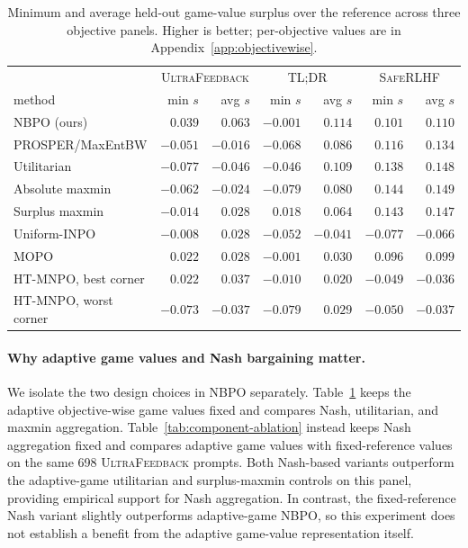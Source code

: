 \documentclass{article}
\theoremstyle{remark}
\theoremstyle{plain}
\newcommand{\NBPO}{\textsc{NBPO}}
\begin{document}
\begin{table}[t]
\centering\scriptsize
\setlength{\tabcolsep}{2.6pt}
\caption{Minimum and average held-out game-value surplus over the reference across three objective panels. Higher is better; per-objective values are in Appendix~\ref{app:objectivewise}.}
\label{tab:multi-dataset-surplus}
\begin{tabular}{lrrrrrr}
\toprule
& \multicolumn{2}{c}{\textsc{UltraFeedback}} & \multicolumn{2}{c}{\textsc{TL;DR}} & \multicolumn{2}{c}{\textsc{SafeRLHF}}\\
\cmidrule(lr){2-3}\cmidrule(lr){4-5}\cmidrule(lr){6-7}
method & min $s$ & avg $s$ & min $s$ & avg $s$ & min $s$ & avg $s$\\
\midrule
\NBPO{} (ours) & $\mathbf{0.039}$ & $\mathbf{0.063}$ & $-0.001$ & $\mathbf{0.114}$ & $0.101$ & $0.110$\\
PROSPER/MaxEntBW & $-0.051$ & $-0.016$ & $-0.068$ & $0.086$ & $0.116$ & $0.134$\\
Utilitarian & $-0.077$ & $-0.046$ & $-0.046$ & $0.109$ & $0.138$ & $0.148$\\
Absolute maxmin & $-0.062$ & $-0.024$ & $-0.079$ & $0.080$ & $\mathbf{0.144}$ & $\mathbf{0.149}$\\
Surplus maxmin & $-0.014$ & $0.028$ & $\mathbf{0.018}$ & $0.064$ & $0.143$ & $0.147$\\
Uniform-INPO & $-0.008$ & $0.028$ & $-0.052$ & $-0.041$ & $-0.077$ & $-0.066$\\
MOPO & $0.022$ & $0.028$ & $-0.001$ & $0.030$ & $0.096$ & $0.099$\\
HT-MNPO, best corner & $0.022$ & $0.037$ & $-0.010$ & $0.020$ & $-0.049$ & $-0.036$\\
HT-MNPO, worst corner & $-0.073$ & $-0.037$ & $-0.079$ & $0.029$ & $-0.050$ & $-0.037$\\
\bottomrule
\end{tabular}
\end{table}

\paragraph{Why adaptive game values and Nash bargaining matter.}
We isolate the two design choices in NBPO separately. Table~\ref{tab:multi-dataset-surplus} keeps the adaptive objective-wise game values fixed and compares Nash, utilitarian, and maxmin aggregation. Table~\ref{tab:component-ablation} instead keeps Nash aggregation fixed and compares adaptive game values with fixed-reference values on the same 698 \textsc{UltraFeedback} prompts. Both Nash-based variants outperform the adaptive-game utilitarian and surplus-maxmin controls on this panel, providing empirical support for Nash aggregation. In contrast, the fixed-reference Nash variant slightly outperforms adaptive-game NBPO, so this experiment does not establish a benefit from the adaptive game-value representation itself.
\end{document}
